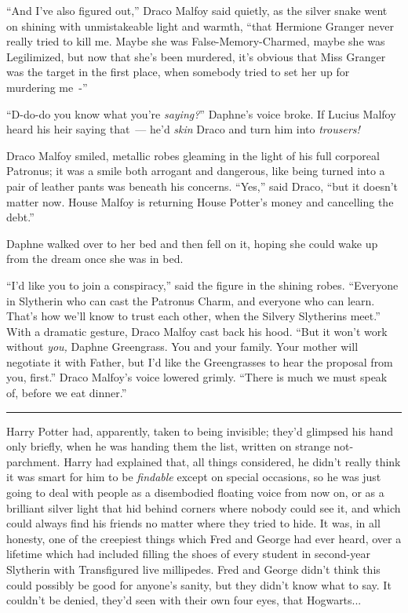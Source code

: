 ``And I've also figured out,'' Draco Malfoy said quietly, as the silver snake went on shining with unmistakeable light and warmth, ``that Hermione Granger never really tried to kill me. Maybe she was False-Memory-Charmed, maybe she was Legilimized, but now that she's been murdered, it's obvious that Miss Granger was the target in the first place, when somebody tried to set her up for murdering me~-''

``D-do-do you know what you're \emph{saying?}'' Daphne's voice broke. If Lucius Malfoy heard his heir saying that~--- he'd \emph{skin} Draco and turn him into \emph{trousers!}

Draco Malfoy smiled, metallic robes gleaming in the light of his full corporeal Patronus; it was a smile both arrogant and dangerous, like being turned into a pair of leather pants was beneath his concerns. ``Yes,'' said Draco, ``but it doesn't matter now. House Malfoy is returning House Potter's money and cancelling the debt.''

Daphne walked over to her bed and then fell on it, hoping she could wake up from the dream once she was in bed.

``I'd like you to join a conspiracy,'' said the figure in the shining robes. ``Everyone in Slytherin who can cast the Patronus Charm, and everyone who can learn. That's how we'll know to trust each other, when the Silvery Slytherins meet.'' With a dramatic gesture, Draco Malfoy cast back his hood. ``But it won't work without \emph{you,} Daphne Greengrass. You and your family. Your mother will negotiate it with Father, but I'd like the Greengrasses to hear the proposal from you, first.'' Draco Malfoy's voice lowered grimly. ``There is much we must speak of, before we eat dinner.''

\begin{center}\rule{3in}{0.4pt}\end{center}

Harry Potter had, apparently, taken to being invisible; they'd glimpsed his hand only briefly, when he was handing them the list, written on strange not-parchment. Harry had explained that, all things considered, he didn't really think it was smart for him to be \emph{findable} except on special occasions, so he was just going to deal with people as a disembodied floating voice from now on, or as a brilliant silver light that hid behind corners where nobody could see it, and which could always find his friends no matter where they tried to hide. It was, in all honesty, one of the creepiest things which Fred and George had ever heard, over a lifetime which had included filling the shoes of every student in second-year Slytherin with Transfigured live millipedes. Fred and George didn't think this could possibly be good for anyone's sanity, but they didn't know what to say. It couldn't be denied, they'd seen with their own four eyes, that Hogwarts...

